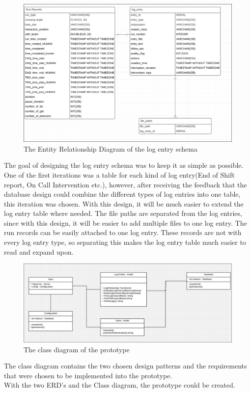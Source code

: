 \documentclass[paper=a4, fontsize=11pt,twoside]{scrartcl}	%
\begin{document}
\begin{figure}[H]
\includegraphics[scale=0.4]{erd_log_entry}
\caption{The Entity Relationship Diagram of the log entry schema}
\end{figure}
The goal of designing the log entry schema was to keep it as simple as possible. One of the first iterations was a table for each kind of log entry(End of Shift report, On Call Intervention etc.), however, after receiving the feedback that the database design could combine the different types of log entries into one table, this iteration was chosen. With this design, it will be much easier to extend the log entry table where needed. The file paths are separated from the log entries, since with this design, it will be easier to add multiple files to one log entry. The run records can be easily attached to one log entry. These records are not with every log entry type, so separating this makes the log entry table much easier to read and expand upon.


\begin{figure}[H]
\includegraphics[scale=0.35]{class_diagram}
\caption{The class diagram of the prototype}
\end{figure}
The class diagram contains the two chosen design patterns and the requirements that were chosen to be implemented into the prototype. \\
With the two ERD's and the Class diagram, the prototype could be created.
\end{document}

